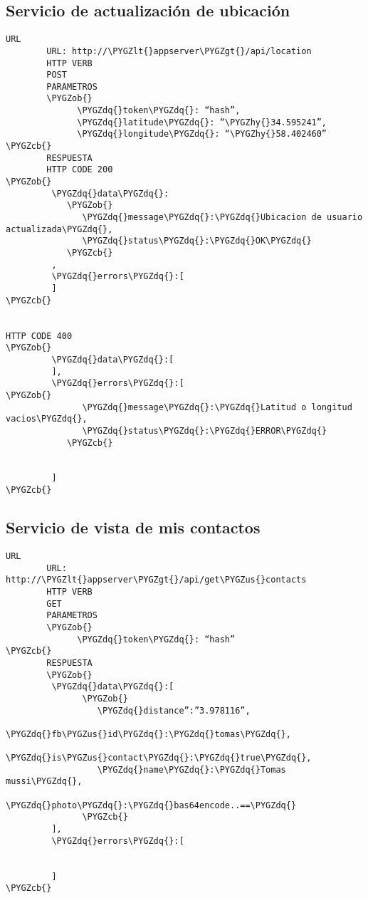 \documentclass[a4paper,10pt,spanish]{sphinxmanual}
\def\PYGZus{\char`\_}
\def\PYGZob{\char`\{}
\def\PYGZcb{\char`\}}
\def\PYGZlt{\char`\<}
\def\PYGZgt{\char`\>}
\def\PYGZhy{\char`\-}
\def\PYGZdq{\char`\"}
\begin{document}
\subsection{Servicio de actualización de ubicación}
\label{apiRest:servicio-de-actualizacion-de-ubicacion}
\begin{Verbatim}[commandchars=\\\{\}]
URL
        URL: http://\PYGZlt{}appserver\PYGZgt{}/api/location
        HTTP VERB
        POST
        PARAMETROS
        \PYGZob{}
              \PYGZdq{}token\PYGZdq{}: “hash”,
              \PYGZdq{}latitude\PYGZdq{}: “\PYGZhy{}34.595241”,
              \PYGZdq{}longitude\PYGZdq{}: “\PYGZhy{}58.402460”
\PYGZcb{}
        RESPUESTA
        HTTP CODE 200
\PYGZob{}
         \PYGZdq{}data\PYGZdq{}:
            \PYGZob{}
               \PYGZdq{}message\PYGZdq{}:\PYGZdq{}Ubicacion de usuario actualizada\PYGZdq{},
               \PYGZdq{}status\PYGZdq{}:\PYGZdq{}OK\PYGZdq{}
            \PYGZcb{}
         ,
         \PYGZdq{}errors\PYGZdq{}:[
         ]
\PYGZcb{}


HTTP CODE 400
\PYGZob{}
         \PYGZdq{}data\PYGZdq{}:[
         ],
         \PYGZdq{}errors\PYGZdq{}:[
\PYGZob{}
               \PYGZdq{}message\PYGZdq{}:\PYGZdq{}Latitud o longitud vacios\PYGZdq{},
               \PYGZdq{}status\PYGZdq{}:\PYGZdq{}ERROR\PYGZdq{}
            \PYGZcb{}


         ]
\PYGZcb{}
\end{Verbatim}


\subsection{Servicio de vista de mis contactos}
\label{apiRest:servicio-de-vista-de-mis-contactos}
\begin{Verbatim}[commandchars=\\\{\}]
URL
        URL: http://\PYGZlt{}appserver\PYGZgt{}/api/get\PYGZus{}contacts
        HTTP VERB
        GET
        PARAMETROS
        \PYGZob{}
              \PYGZdq{}token\PYGZdq{}: “hash”
\PYGZcb{}
        RESPUESTA
        \PYGZob{}
         \PYGZdq{}data\PYGZdq{}:[
               \PYGZob{}
                  \PYGZdq{}distance”:”3.978116”,
                  \PYGZdq{}fb\PYGZus{}id\PYGZdq{}:\PYGZdq{}tomas\PYGZdq{},
                  \PYGZdq{}is\PYGZus{}contact\PYGZdq{}:\PYGZdq{}true\PYGZdq{},
                  \PYGZdq{}name\PYGZdq{}:\PYGZdq{}Tomas mussi\PYGZdq{},
                  \PYGZdq{}photo\PYGZdq{}:\PYGZdq{}bas64encode..==\PYGZdq{}
               \PYGZcb{}
         ],
         \PYGZdq{}errors\PYGZdq{}:[


         ]
\PYGZcb{}
\end{Verbatim}
\end{document}
